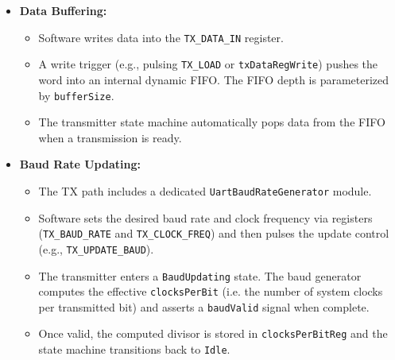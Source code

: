 \begin{itemize}
    \item \textbf{Data Buffering:} 
    \begin{itemize}
        \item Software writes data into the \texttt{TX\_DATA\_IN} register.
        \item A write trigger (e.g., pulsing \texttt{TX\_LOAD} or \texttt{txDataRegWrite}) pushes the word into an internal dynamic FIFO. The FIFO depth is parameterized by \texttt{bufferSize}.
        \item The transmitter state machine automatically pops data from the FIFO when a transmission is ready.
    \end{itemize}
    
    \item \textbf{Baud Rate Updating:}
    \begin{itemize}
        \item The TX path includes a dedicated \texttt{UartBaudRateGenerator} module.
        \item Software sets the desired baud rate and clock frequency via registers (\texttt{TX\_BAUD\_RATE} and \texttt{TX\_CLOCK\_FREQ}) and then pulses the update control (e.g., \texttt{TX\_UPDATE\_BAUD}).
        \item The transmitter enters a \texttt{BaudUpdating} state. The baud generator computes the effective \texttt{clocksPerBit} (i.e. the number of system clocks per transmitted bit) and asserts a \texttt{baudValid} signal when complete.
        \item Once valid, the computed divisor is stored in \texttt{clocksPerBitReg} and the state machine transitions back to \texttt{Idle}.
    \end{itemize}
    

\end{itemize}

